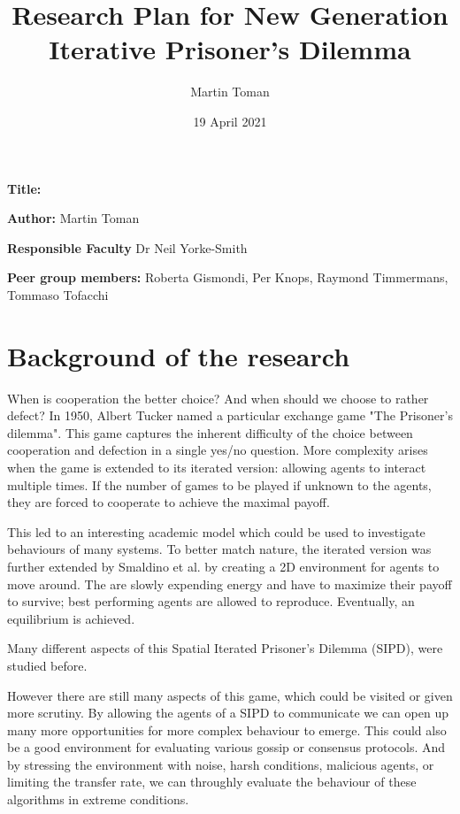 \documentclass[english]{article}
\title{Research Plan for New Generation Iterative Prisoner's Dilemma}
\author{Martin Toman}
\date{19 April 2021}
\newcommand{\namelistlabel}[1]{\mbox{#1}\hfil}
\newenvironment{namelist}[1]{%
\begin{list}{}{
  \let\makelabel\namelistlabel
  \settowidth{\labelwidth}{#1}
  \setlength{\leftmargin}{1.1\labelwidth}
}}{%
\end{list}}
\begin{document}
\maketitle
\begin{namelist}{}
\item[{\bf Title:}]
\item[{\bf Author:}]
  Martin Toman
\item[{\bf Responsible Faculty}]
  Dr Neil Yorke-Smith
\item[{\bf Peer group members:}]
  Roberta Gismondi,
  Per Knops,
  Raymond Timmermans,
  Tommaso Tofacchi
\end{namelist}



\section*{Background of the research}
When is cooperation the better choice? And when should we choose to rather defect?
In 1950, Albert Tucker named a particular exchange game "The Prisoner’s dilemma".\cite{encyclopedia} This game captures the inherent difficulty of the choice between cooperation and defection in a single yes/no question.
More complexity arises when the game is extended to its iterated version: allowing agents to interact multiple times. If the number of games to be played if unknown to the agents, they are forced to cooperate to achieve the maximal payoff.

This led to an interesting academic model which could be used to investigate behaviours of many systems.
To better match nature, the iterated version was further extended by Smaldino et al.\cite{smaldino} by creating a 2D environment for agents to move around. The are slowly expending energy and have to maximize their payoff to survive; best performing agents are allowed to reproduce. Eventually, an equilibrium is achieved.

Many different aspects of this Spatial Iterated Prisoner’s Dilemma (SIPD), were studied before. 


However there are still many aspects of this game, which could be visited or given more scrutiny.
By allowing the agents of a SIPD to communicate we can open up many more opportunities for more complex behaviour to emerge.
This could also be a good environment for evaluating various gossip or consensus protocols. 
And by stressing the environment with noise, harsh conditions, malicious agents, or limiting the transfer rate, we can throughly evaluate the behaviour of these algorithms in extreme conditions.
\end{document}

